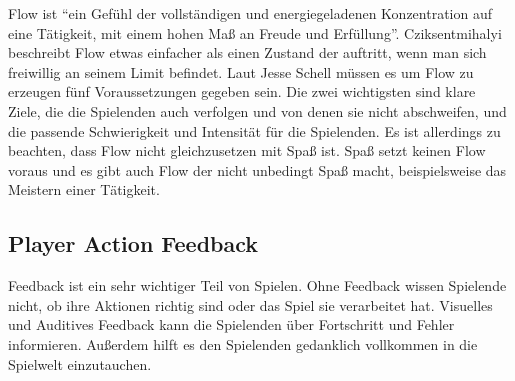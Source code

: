 Flow ist "`ein Gefühl der vollständigen und energiegeladenen Konzentration auf eine Tätigkeit, mit einem hohen Maß an Freude und Erfüllung"'\cite[S.204]{_art_of_gamedesign}.
Cziksentmihalyi beschreibt Flow etwas einfacher als einen Zustand der auftritt, wenn man sich freiwillig an seinem Limit befindet\cite{_flow}.
Laut Jesse Schell müssen es um Flow zu erzeugen fünf Voraussetzungen gegeben sein\cite[S.211]{_art_of_gamedesign}. Die zwei wichtigsten sind klare Ziele, die die Spielenden auch verfolgen und von denen sie nicht abschweifen, und die passende Schwierigkeit und Intensität für die Spielenden. Es ist allerdings zu beachten, dass Flow nicht gleichzusetzen mit Spaß ist. Spaß setzt keinen Flow voraus und es gibt auch Flow der nicht unbedingt Spaß macht, beispielsweise das Meistern einer Tätigkeit\cite[S.75]{_theory_of_fun}.

\subsection{Player Action Feedback\label{_feedback}}

Feedback ist ein sehr wichtiger Teil von Spielen. Ohne Feedback wissen Spielende nicht, ob ihre Aktionen richtig sind oder das Spiel sie verarbeitet hat. Visuelles und Auditives Feedback kann die Spielenden über Fortschritt und Fehler informieren. Außerdem hilft es den Spielenden gedanklich vollkommen in die Spielwelt einzutauchen.